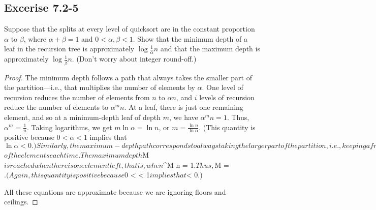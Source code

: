 \documentclass{article}
\begin{document}
\subsection*{Excerise 7.2-5}
Suppose that the splits at every level of quicksort are in the constant proportion $\alpha$ to $\beta$, where $\alpha + \beta = 1$ and $0 < \alpha, \beta < 1$. 
Show that the minimum depth of a leaf in the recursion tree is approximately $\log \frac{1}{\alpha} n$ and that the maximum depth is approximately $\log \frac{1}{\beta} n$. (Don't worry about integer round-off.)
\begin{proof}
The minimum depth follows a path that always takes the smaller part of the partition—i.e., 
that multiplies the number of elements by $\alpha$. 
One level of recursion reduces the number of elements from $n$ to $\alpha n$, 
and $i$ levels of recursion reduce the number of elements to $\alpha^m n$. 
At a leaf, there is just one remaining element, 
and so at a minimum-depth leaf of depth $m$, we have $\alpha^m n = 1$. 
Thus, $\alpha^m = \frac{1}{n}$. 
Taking logarithms, we get $m \ln \alpha = \ln n$, or $m = \frac{\ln n}{\ln \alpha}$. 
(This quantity is positive because $0 < \alpha < 1$ implies that $\ln \alpha < 0.)


Similarly, the maximum-depth path corresponds to always taking the larger part of the partition, 
i.e., keeping a fraction $\beta$ of the elements each time. 
The maximum depth $M$ is reached when there is one element left, 
that is, when $\beta^M n = 1$. 
Thus, $M = $. (Again, this quantity is positive because $0 < \beta < 1$ implies that $\log \beta < 0.)

All these equations are approximate because we are ignoring floors and ceilings.
    
\end{proof}
\end{document}
